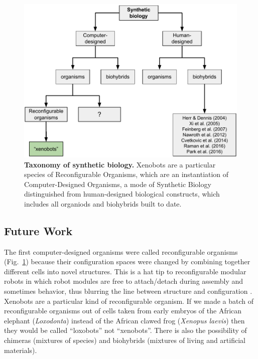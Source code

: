 \begin{figure}[t]
    \centering
    \includegraphics[width=0.8\linewidth]{fig/synthbio.pdf}
    \vspace{1pt}
    \caption{%
    \textbf{Taxonomy of synthetic biology.}
    Xenobots are a particular species of Reconfigurable Organisms, which are an instantiation of Computer-Designed Organisms, a mode of Synthetic Biology distinguished from human-designed biological constructs, which includes all organiods and biohybrids built to date.
    \label{fig:synthbio}%
    }
\end{figure}


\subsection{Future Work}


The first computer-designed organisms were called reconfigurable organisms (Fig.~\ref{fig:synthbio}) because their configuration spaces were changed by combining together different cells into novel structures.
This is a hat tip to reconfigurable modular robots in which robot modules are free to attach/detach during assembly and sometimes behavior, thus blurring the line between structure and configuration  \cite{pathak2019learning}.
Xenobots are a particular kind of reconfigurable organism.
If we made a batch of reconfigurable organisms out of cells taken from early embryos of the
African elephant (\textit{Loxodonta})
instead of the African clawed frog (\textit{Xenopus laevis})
then they would be called ``loxobots'' not ``xenobots''.
There is also the possibility of chimeras (mixtures of species) and biohybrids (mixtures of living and artificial materials).


